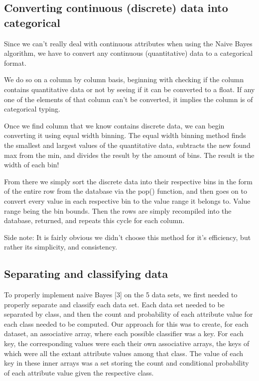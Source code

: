 \documentclass[twoside,11pt]{article}
\begin{document}
\subsection{Converting continuous (discrete) data into categorical}

Since we can’t really deal with continuous attributes when using the Naive Bayes algorithm, we have to convert any continuous (quantitative) data to a categorical format. 

We do so on a column by column basis, beginning with checking if the column contains quantitative data or not by seeing if it can be converted to a float. If any one of the elements of that column can’t be converted, it implies the column is of categorical typing. 

Once we find  column that we know contains discrete data, we can begin converting it using equal width binning. The equal width binning method finds the smallest and largest values of the quantitative data, subtracts the new found max from the min, and divides the result by the amount of bins. The result is the width of each bin!

From there we simply sort the discrete data into their respective bins in the form of the entire row from the database via the pop() function, and then goes on to convert every value in each respective bin to the value range it belongs to. Value range being the bin bounds. Then the rows are simply recompiled into the database, returned, and repeats this cycle for each column.

Side note: It is fairly obvious we didn't choose this method for it’s efficiency, but rather its simplicity, and consistency.


\subsection{Separating and classifying data}
To properly implement naive Bayes [3] on the 5 data sets, we first needed to properly separate and classify each data set. Each data set needed to be separated by class, and then the count and probability of each attribute value for each class needed to be computed. Our approach for this was to create, for each dataset, an associative array, where each possible classifier was a key. For each key, the corresponding values were each their own associative arrays, the keys of which were all the extant attribute values among that class. The value of each key in these inner arrays was a set storing the count and conditional probability of each attribute value given the respective class. \\ \\
\end{document}
